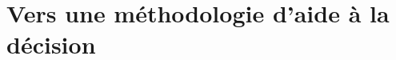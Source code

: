 \section{Vers une méthodologie d’aide à la décision} %
\label{sec:vers_une_methodologie_d_aide_a_la_decision}



























